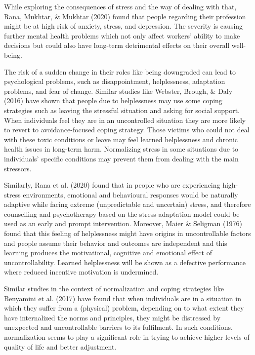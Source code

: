 \documentclass[
11pt, %
oneside, %
english, %
singlespacing, %
]{macthesis} %
\begin{document}
While exploring the consequences of stress and the way of dealing with that, Rana, Mukhtar, \& Mukhtar (2020) found that people regarding their profession might be at high risk of anxiety, stress, and depression. The severity is causing further mental health problems which not only affect workers' ability to make decisions but could also have long-term detrimental effects on their overall well-being.

The risk of a sudden change in their roles like being downgraded can lead to psychological problems, such as disappointment, helplessness, adaptation problems, and fear of change. Similar studies like Webster, Brough, \& Daly (2016) have shown that people due to helplessness may use some coping strategies such as leaving the stressful situation and asking for social support. When individuals feel they are in an uncontrolled situation they are more likely to revert to avoidance-focused coping strategy. Those victims who could not deal with these toxic conditions or leave may feel learned helplessness and chronic health issues in long-term harm. Normalizing stress in some situations due to individuals' specific conditions may prevent them from dealing with the main stressors.

Similarly, Rana et al. (2020) found that in people who are experiencing high-stress environments, emotional and behavioural responses would be naturally adaptive while facing extreme (unpredictable and uncertain) stress, and therefore counselling and psychotherapy based on the stress-adaptation model could be used as an early and prompt intervention. Moreover, Maier \& Seligman (1976) found that this feeling of helplessness might have origins in uncontrollable factors and people assume their behavior and outcomes are independent and this learning produces the motivational, cognitive and emotional effect of uncontrollability. Learned helplessness will be shown as a defective performance where reduced incentive motivation is undermined.

Similar studies in the context of normalization and coping strategies like Benyamini et al. (2017) have found that when individuals are in a situation in which they suffer from a (physical) problem, depending on to what extent they have internalized the norms and principles, they might be distressed by unexpected and uncontrollable barriers to its fulfilment. In such conditions, normalization seems to play a significant role in trying to achieve higher levels of quality of life and better adjustment.
\end{document}
